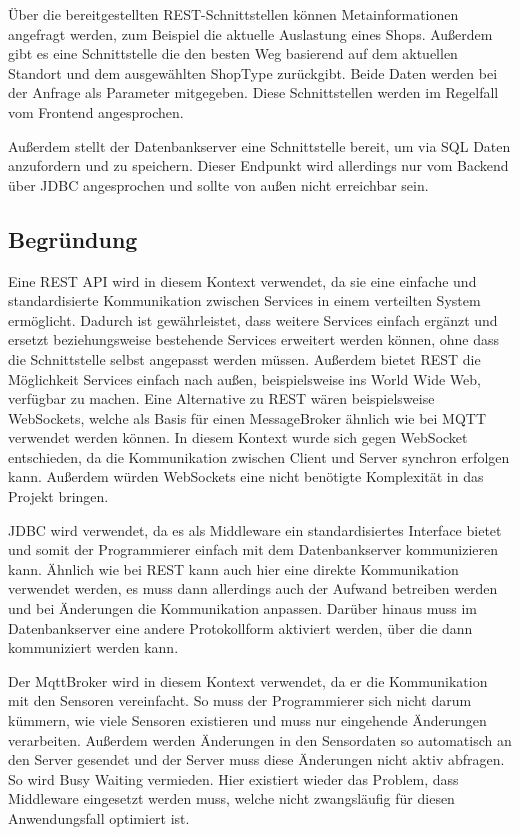 \documentclass[runningheads]{llncs}
\begin{document}
Über die bereitgestellten REST-Schnittstellen können Metainformationen angefragt werden, zum Beispiel die aktuelle Auslastung eines Shops.
Außerdem gibt es eine Schnittstelle die den besten Weg basierend auf dem aktuellen Standort und dem ausgewählten ShopType zurückgibt.
Beide Daten werden bei der Anfrage als Parameter mitgegeben.
Diese Schnittstellen werden im Regelfall vom Frontend angesprochen.

Außerdem stellt der Datenbankserver eine Schnittstelle bereit, um via SQL Daten anzufordern und zu speichern.
Dieser Endpunkt wird allerdings nur vom Backend über JDBC angesprochen und sollte von außen nicht erreichbar sein.

\subsection{Begründung}
Eine REST API wird in diesem Kontext verwendet, da sie eine einfache und standardisierte Kommunikation zwischen Services in einem verteilten System ermöglicht.
Dadurch ist gewährleistet, dass weitere Services einfach ergänzt und ersetzt beziehungsweise bestehende Services erweitert werden können, ohne dass die Schnittstelle selbst angepasst werden müssen.
Außerdem bietet REST die Möglichkeit Services einfach nach außen, beispielsweise ins World Wide Web, verfügbar zu machen.
Eine Alternative zu REST wären beispielsweise WebSockets, welche als Basis für einen MessageBroker ähnlich wie bei MQTT verwendet werden können.
In diesem Kontext wurde sich gegen WebSocket entschieden, da die Kommunikation zwischen Client und Server synchron erfolgen kann.
Außerdem würden WebSockets eine nicht benötigte Komplexität in das Projekt bringen.

JDBC wird verwendet, da es als Middleware ein standardisiertes Interface bietet und somit der Programmierer einfach mit dem Datenbankserver kommunizieren kann.
Ähnlich wie bei REST kann auch hier eine direkte Kommunikation verwendet werden, es muss dann allerdings auch der Aufwand betreiben werden und bei Änderungen die Kommunikation anpassen.
Darüber hinaus muss im Datenbankserver eine andere Protokollform aktiviert werden, über die dann kommuniziert werden kann.

Der MqttBroker wird in diesem Kontext verwendet, da er die Kommunikation mit den Sensoren vereinfacht.
So muss der Programmierer sich nicht darum kümmern, wie viele Sensoren existieren und muss nur eingehende Änderungen verarbeiten.
Außerdem werden Änderungen in den Sensordaten so automatisch an den Server gesendet und der Server muss diese Änderungen nicht aktiv abfragen.
So wird Busy Waiting vermieden.
Hier existiert wieder das Problem, dass Middleware eingesetzt werden muss, welche nicht zwangsläufig für diesen Anwendungsfall optimiert ist.


\newpage


\end{document}
